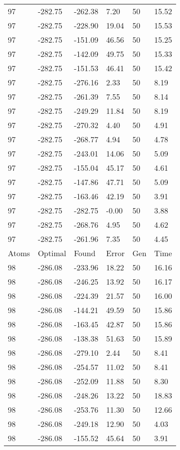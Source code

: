 \documentclass{report}
\begin{document}
\begin{appendix}
\begin{longtable}{llllll}
97 & -282.75 & -262.38 & 7.20 & 50 & 15.52 \\
97 & -282.75 & -228.90 & 19.04 & 50 & 15.53 \\
97 & -282.75 & -151.09 & 46.56 & 50 & 15.25 \\
97 & -282.75 & -142.09 & 49.75 & 50 & 15.33 \\
97 & -282.75 & -151.53 & 46.41 & 50 & 15.42 \\
97 & -282.75 & -276.16 & 2.33 & 50 & 8.19 \\
97 & -282.75 & -261.39 & 7.55 & 50 & 8.14 \\
97 & -282.75 & -249.29 & 11.84 & 50 & 8.19 \\
97 & -282.75 & -270.32 & 4.40 & 50 & 4.91 \\
97 & -282.75 & -268.77 & 4.94 & 50 & 4.78 \\
97 & -282.75 & -243.01 & 14.06 & 50 & 5.09 \\
97 & -282.75 & -155.04 & 45.17 & 50 & 4.61 \\
97 & -282.75 & -147.86 & 47.71 & 50 & 5.09 \\
97 & -282.75 & -163.46 & 42.19 & 50 & 3.91 \\
97 & -282.75 & -282.75 & -0.00 & 50 & 3.88 \\
97 & -282.75 & -268.76 & 4.95 & 50 & 4.62 \\
97 & -282.75 & -261.96 & 7.35 & 50 & 4.45 \\
Atoms & Optimal & Found & Error & Gen & Time \\
98 & -286.08 & -233.96 & 18.22 & 50 & 16.16 \\
98 & -286.08 & -246.25 & 13.92 & 50 & 16.17 \\
98 & -286.08 & -224.39 & 21.57 & 50 & 16.00 \\
98 & -286.08 & -144.21 & 49.59 & 50 & 15.86 \\
98 & -286.08 & -163.45 & 42.87 & 50 & 15.86 \\
98 & -286.08 & -138.38 & 51.63 & 50 & 15.89 \\
98 & -286.08 & -279.10 & 2.44 & 50 & 8.41 \\
98 & -286.08 & -254.57 & 11.02 & 50 & 8.41 \\
98 & -286.08 & -252.09 & 11.88 & 50 & 8.30 \\
98 & -286.08 & -248.26 & 13.22 & 50 & 18.83 \\
98 & -286.08 & -253.76 & 11.30 & 50 & 12.66 \\
98 & -286.08 & -249.18 & 12.90 & 50 & 4.03 \\
98 & -286.08 & -155.52 & 45.64 & 50 & 3.91 \\

\end{longtable}
\end{appendix}
\end{document}
